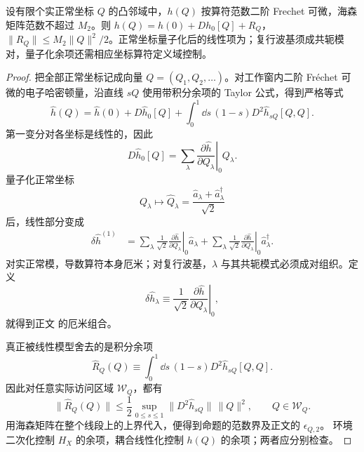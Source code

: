 \begin{proposition}[算符值哈密顿量的第一变分与余项]
设有限个实正常坐标 $Q$ 的凸邻域中，$h(Q)$ 按算符范数二阶 Frechet 可微，海森矩阵范数不超过 $M_2$。则 $h(Q)=h(0)+Dh_0[Q]+R_Q$，$\|R_Q\|\le M_2\|Q\|^2/2$。正常坐标量子化后的线性项为；复行波基须成共轭模对，量子化余项还需相应坐标算符定义域控制。
\end{proposition}
\begin{proof}
把全部正常坐标记成向量 $Q=(Q_1,Q_2,\ldots)$。对工作窗内二阶 Fr\'echet 可微的电子哈密顿量，沿直线 $sQ$ 使用带积分余项的 Taylor 公式，得到严格等式
\[
\hat h(Q)
=\hat h(0)
+D\hat h_0[Q]
+\int_0^1\dd s\,(1-s)
D^2\hat h_{sQ}[Q,Q].
\]
第一变分对各坐标是线性的，因此
\[
D\hat h_0[Q]
=\sum_\lambda
\left.\frac{\partial\hat h}{\partial Q_\lambda}\right|_0 Q_\lambda.
\]
量子化正常坐标
\[
Q_\lambda\longmapsto
\hat Q_\lambda
=\frac{\hat a_\lambda+\hat a_\lambda^\dagger}{\sqrt2}
\]
后，线性部分变成
\begin{align*}
\delta\hat h^{(1)}
&=\sum_\lambda\frac1{\sqrt2}
\left.\frac{\partial\hat h}{\partial Q_\lambda}\right|_0
\hat a_\lambda
+\sum_\lambda\frac1{\sqrt2}
\left.\frac{\partial\hat h}{\partial Q_\lambda}\right|_0
\hat a_\lambda^\dagger .
\end{align*}
对实正常模，导数算符本身厄米；对复行波基，$\lambda$ 与其共轭模式必须成对组织。定义
\[
\delta\hat h_\lambda
\equiv
\frac1{\sqrt2}
\left.\frac{\partial\hat h}{\partial Q_\lambda}\right|_0,
\]
就得到正文 的厄米组合。

真正被线性模型舍去的是积分余项
\[
\hat R_Q(Q)
\equiv
\int_0^1\dd s\,(1-s)
D^2\hat h_{sQ}[Q,Q].
\]
因此对任意实际访问区域 $\mathcal W_Q$，都有
\[
\|\hat R_Q(Q)\|
\le
\frac12
\sup_{0\le s\le1}
\bigl\|D^2\hat h_{sQ}\bigr\|\,\|Q\|^2,
\qquad Q\in\mathcal W_Q.
\]
用海森矩阵在整个线段上的上界代入，便得到命题的范数界及正文的 $\epsilon_{Q,2}$。
环境二次化控制 $H_X$ 的余项，耦合线性化控制 $h(Q)$ 的余项；两者应分别检查。
\end{proof}

